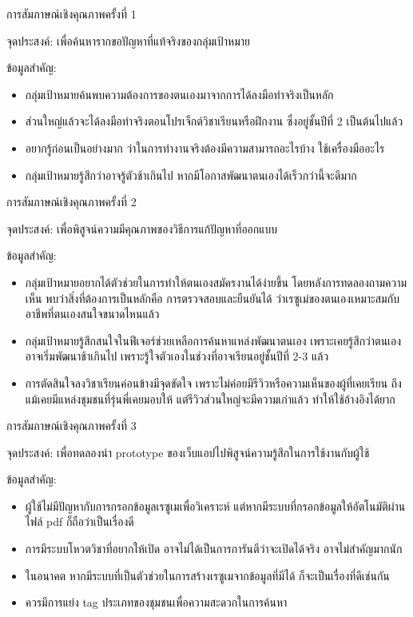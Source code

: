 การสัมภาษณ์เชิงคุณภาพครั้งที่ 1

จุดประสงค์: เพื่อค้นหารากขอปัญหาที่แท้จริงของกลุ่มเป้าหมาย

ข้อมูลสำคัญ: 
\begin{itemize}
    \item กลุ่มเป้าหมายค้นพบความต้องการของตนเองมาจากการได้ลงมือทำจริงเป็นหลัก
    \item ส่วนใหญ่แล้วจะได้ลงมือทำจริงตอนโปรเจ็กต์วิชาเรียนหรือฝึกงาน ซึ่งอยู่ชั้นปีที่ 2 เป็นต้นไปแล้ว
    \item อยากรู้ก่อนเป็นอย่างมาก ว่าในการทำงานจริงต้องมีความสามารถอะไรบ้าง ใช้เครื่องมืออะไร
    \item กลุ่มเป้าหมายรู้สึกว่าอาจรู้ตัวช้าเกินไป หากมีโอกาสพัฒนาตนเองได้เร็วกว่านี้จะดีมาก
\end{itemize}

การสัมภาษณ์เชิงคุณภาพครั้งที่ 2

จุดประสงค์: เพื่อพิสูจน์ความมีคุณภาพของวิธีการแก้ปัญหาที่ออกแบบ


ข้อมูลสำคัญ: 
\begin{itemize}
    \item กลุ่มเป้าหมายอยากได้ตัวช่วยในการทำให้ตนเองสมัครงานได้ง่ายขึ้น โดยหลังการทดลองถามความเห็น พบว่าสิ่งที่ต้องการเป็นหลักคือ การตรวจสอบและยืนยันได้ ว่าเรซูเม่ของตนเองเหมาะสมกับอาชีพที่ตนเองสนใจขนาดไหนแล้ว
    \item กลุ่มเป้าหมายรู้สึกสนใจในฟีเจอร์ช่วยเหลือการค้นหาแหล่งพัฒนาตนเอง เพราะเคยรู้สึกว่าตนเองอาจเริ่มพัฒนาช้าเกินไป เพราะรู้ใจตัวเองในช่วงที่อาจเรียนอยู่ชั้นปีที่ 2-3 แล้ว
    \item การตัดสินใจลงวิชาเรียนค่อนข้างมีจุดขัดใจ เพราะไม่ค่อยมีรีวิวหรือความเห็นของผู้ที่เคยเรียน ถึงแม้เคยมีแหล่งชุมชนที่รุ่นพี่เคยมอบให้ แต่รีวิวส่วนใหญ่จะมีความเก่าแล้ว ทำให้ใช้อ้างอิงได้ยาก
\end{itemize}

การสัมภาษณ์เชิงคุณภาพครั้งที่ 3

จุดประสงค์: เพื่อทดลองนำ prototype ของเว็บแอปไปพิสูจน์ความรู้สึกในการใช้งานกับผู้ใช้

ข้อมูลสำคัญ:
\begin{itemize}
    \item ผู้ใช้ไม่มีปัญหากับการกรอกข้อมูลเรซูเมเพื่อวิเคราะห์ แต่หากมีระบบที่กรอกข้อมูลให้อัตโนมัติผ่านไฟล์ pdf ก็ถือว่าเป็นเรื่องดี
    \item การมีระบบโหวตวิชาที่อยากให้เปิด อาจไม่ได้เป็นการการันตีว่าจะเปิดได้จริง อาจไม่สำคัญมากนัก
    \item ในอนาคต หากมีระบบที่เป็นตัวช่วยในการสร้างเรซูเมจากข้อมูลที่มีได้ ก็จะเป็นเรื่องที่ดีเช่นกัน
    \item ควรมีการแย่ง tag ประเภทของชุมชนเพื่อความสะดวกในการค้นหา
\end{itemize}

